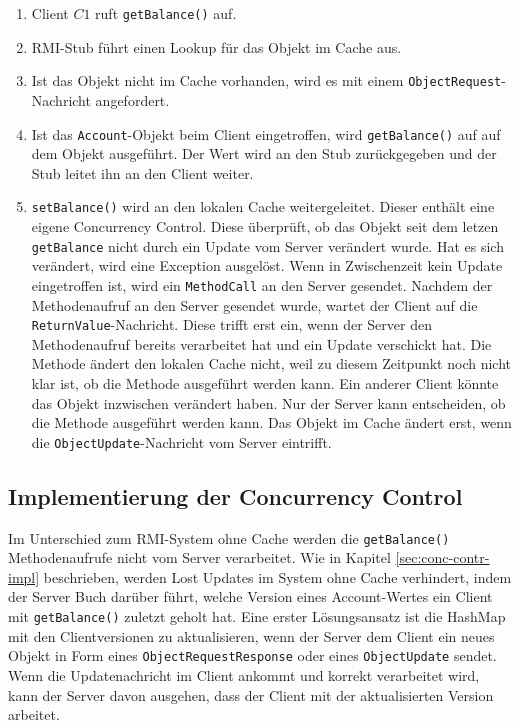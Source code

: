 \begin{enumerate}
\item Client $C1$ ruft \verb+getBalance()+ auf.
\item RMI-Stub führt einen Lookup für das Objekt im Cache aus.
\item Ist das Objekt nicht im Cache vorhanden, wird es mit einem \texttt{Object\-Request}-Nachricht angefordert.
\item Ist das \texttt{Account}-Objekt beim Client eingetroffen, wird \verb+getBalance()+ auf auf dem Objekt ausgeführt. Der Wert wird an den Stub zurück\-gegeben und der Stub leitet ihn an den Client weiter.
\item \verb+setBalance()+ wird an den lokalen Cache weitergeleitet. Dieser enthält eine eigene Concurrency Control. Diese überprüft, ob das Objekt seit dem letzen \verb+getBalance+ nicht durch ein Update vom Server verändert wurde. Hat es sich verändert, wird eine Exception ausgelöst. Wenn in Zwischenzeit kein Update eingetroffen ist, wird ein \texttt{MethodCall} an den Server gesendet. Nachdem der Methodenaufruf an den Server gesendet wurde, wartet der Client auf die \texttt{ReturnValue}-Nachricht. Diese trifft erst ein, wenn der Server den Methodenaufruf bereits verarbeitet hat und ein Update verschickt hat. Die Methode ändert den lokalen Cache nicht, weil zu diesem Zeitpunkt noch nicht klar ist, ob die Methode ausgeführt werden kann. Ein anderer Client könnte das Objekt inzwischen verändert haben. Nur der Server kann entscheiden, ob die Methode ausgeführt werden kann. Das Objekt im Cache ändert erst, wenn die \texttt{ObjectUpdate}-Nachricht vom Server eintrifft.
\end{enumerate}

\subsection{Implementierung der Concurrency Control}
\label{sec:impl-der-conc}

Im Unterschied zum RMI-System ohne Cache werden die \texttt{getBalance()} Methodenaufrufe nicht vom Server verarbeitet. Wie in Kapitel \ref{sec:conc-contr-impl} beschrieben, werden Lost Updates im System ohne Cache verhindert, indem der Server Buch darüber führt, welche Version eines Account-Wertes ein Client mit \texttt{getBalance()} zuletzt geholt hat. Eine erster Lösungsansatz ist die HashMap mit den Clientversionen zu aktualisieren, wenn der Server dem Client ein neues Objekt in Form eines \texttt{ObjectRequestResponse} oder eines \texttt{ObjectUpdate} sendet. Wenn die Updatenachricht im Client ankommt und korrekt verarbeitet wird, kann der Server davon ausgehen, dass der Client mit der aktualisierten Version arbeitet.

